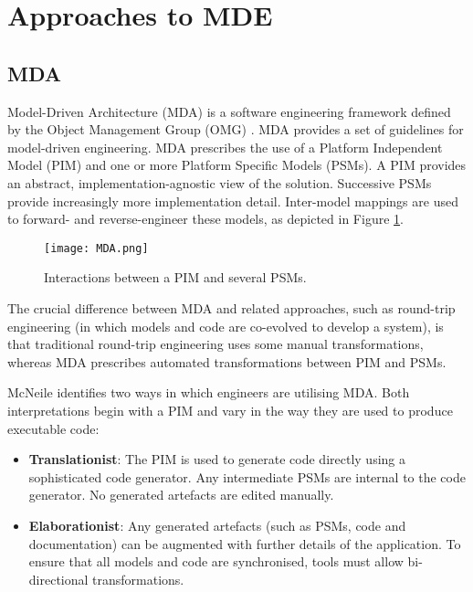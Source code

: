 
\section{Approaches to MDE}
\label{sec:mde_approaches}

\subsection{MDA}
Model-Driven Architecture (MDA) is a software engineering framework defined by the Object Management
Group (OMG) \cite{omg}. MDA provides a set of guidelines for model-driven engineering. MDA prescribes the use of a Platform Independent Model (PIM) and one or more Platform Specific Models (PSMs).
A PIM provides an abstract, implementation-agnostic view of the solution. Successive PSMs provide increasingly more implementation detail. Inter-model mappings are used to forward- and reverse-engineer these models, as depicted in
Figure \ref{fig:mda}.

\begin{figure}[htbp]
  \begin{center}
    \leavevmode
    \texttt{[image: MDA.png]}
  \end{center}
  \caption{Interactions between a PIM and several PSMs.}
  \label{fig:mda}
\end{figure}

The crucial difference between MDA and related approaches, such as round-trip engineering (in which models and code are co-evolved to develop a system), is that traditional round-trip engineering uses some manual transformations, whereas MDA prescribes automated transformations between PIM and PSMs.

McNeile \cite{mcneile03mda} identifies two ways in which engineers are utilising MDA. Both interpretations begin with a PIM and vary in the way they are used to produce executable code:

\begin{itemize}
 \item \textbf{Translationist}: The PIM is used to generate code directly using a sophisticated code generator. Any intermediate PSMs are internal to the code generator. No generated artefacts are edited manually.
 \item \textbf{Elaborationist}: Any generated artefacts (such as PSMs, code and documentation) can be augmented with further details of the application. To ensure that all models and code are synchronised, tools must allow bi-directional transformations.
\end{itemize}

